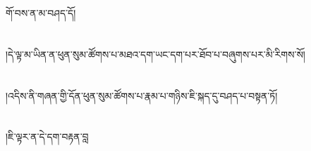 གོ་བས་ན་མ་བཤད་དོ།\chapter{ }།དེ་ལྟ་མ་ཡིན་ན་ཕུན་སུམ་ཚོགས་པ་མཐའ་དག་ཡང་དག་པར་ཐོབ་པ་བཞུགས་པར་མི་རིགས་སོ།\chapter{ }།འདིས་ནི་གཞན་གྱི་དོན་ཕུན་སུམ་ཚོགས་པ་རྣམ་པ་གཉིས་ཇི་སྐད་དུ་བཤད་པ་བསྟན་ཏོ།\chapter{ }།ཇི་ལྟར་ན་དེ་དག་བརྟན་བླ